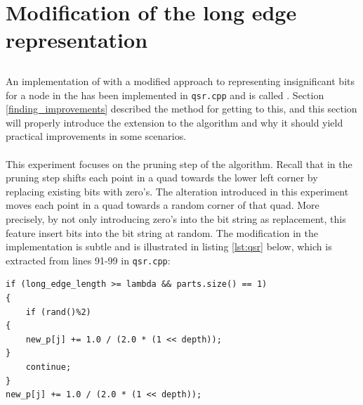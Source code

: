 \section{Modification of the \qs{} long edge representation}
\label{qsr}
\subsection{\qsr{}}

An implementation of \qs{} with a modified approach to representing insignificant bits for a node in the \qt{} has been implemented in \texttt{qsr.cpp} and is called \qsr{}. Section \ref{finding_improvements} described the method for getting to this, and this section will properly introduce the extension to the algorithm and why it should yield practical improvements in some scenarios.
\\
\\
This experiment focuses on the pruning step of the algorithm. Recall that in the pruning step \qs{} shifts each point in a quad towards the lower left corner by replacing existing bits with zero's. The alteration introduced in this experiment moves each point in a quad towards a random corner of that quad. More precisely, by not only introducing zero's into the bit string as replacement, this feature insert bits into the bit string at random. The modification in the implementation is subtle and is illustrated in listing \ref{lst:qsr} below, which is extracted from lines 91-99 in \texttt{qsr.cpp}:

\begin{lstlisting}[caption={Pruning with random bits},label={lst:qsr}]
if (long_edge_length >= lambda && parts.size() == 1)
{
	if (rand()%2)
{
	new_p[j] += 1.0 / (2.0 * (1 << depth));
}
	continue;
}
new_p[j] += 1.0 / (2.0 * (1 << depth));
\end{lstlisting}


